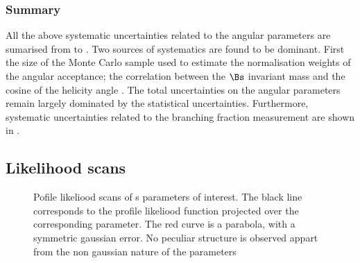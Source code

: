 \subsubsection{Summary}
\label{systSummary}
All the above systematic uncertainties related to the angular parameters are sumarised from 
to . Two sources of systematics are found to be dominant. First the size of the Monte
Carlo sample used to estimate the normalisation weights of the angular acceptance; the correlation between the $\Bs$ invariant
mass and the cosine of the helicity angle \thetamu. The total uncertainties on the angular parameters remain largely dominated
by the statistical uncertainties. Furthermore, systematic uncertainties related to the branching fraction measurement
are shown in .

\subsection{Likelihood scans}
\label{nllscans}

\begin{figure}[h]
  \centering
  \begin{subfigure}{0.5\textwidth}
    \scalebox{0.60}{}
    \caption{}
    \label{nll_ACP0}
  \end{subfigure}%
  \hfill%
  \begin{subfigure}{0.5\textwidth}
    \scalebox{0.60}{}
    \caption{}
    \label{nll_ACPperp}
  \end{subfigure}
  \begin{subfigure}{0.5\textwidth}
    \scalebox{0.60}{}
    \caption{}
    \label{nll_ACPpar}
  \end{subfigure}%
  \hfill%
  \begin{subfigure}{0.5\textwidth}
    \scalebox{0.60}{}
    \caption{}
    \label{nll_ACPS}
  \end{subfigure}
\caption{Pofile likeliood scans of \Acp{} parameters of interest. The black line corresponds to the profile likeliood
         function projected over the corresponding parameter. The red curve is a parabola, with a symmetric gaussian 
         error. No peculiar structure is observed appart from the non gaussian nature of the parameters}
\end{figure}

